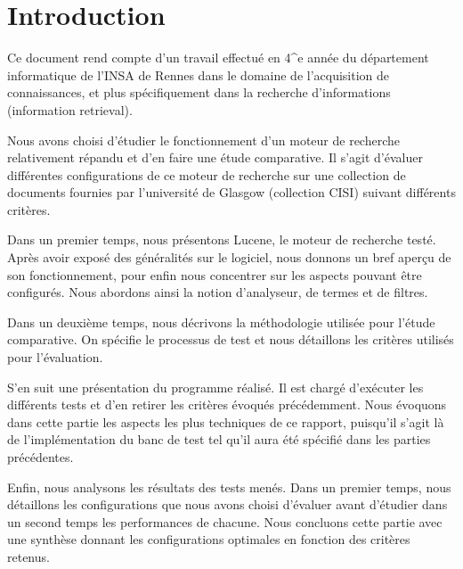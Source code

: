 \section{Introduction}

Ce document rend compte d’un travail effectué en 4^{e} année du département informatique de l’INSA de Rennes dans le domaine de l’acquisition de connaissances, et plus spécifiquement dans la recherche d’informations (information retrieval).

Nous avons choisi d’étudier le fonctionnement d’un moteur de recherche relativement répandu et d’en faire une étude comparative. Il s’agit d’évaluer différentes configurations de ce moteur de recherche sur une collection de documents fournies par l’université de Glasgow (collection CISI) suivant différents critères.

Dans un premier temps, nous présentons Lucene, le moteur de recherche testé. Après avoir exposé des généralités sur le logiciel, nous donnons un bref aperçu de son fonctionnement, pour enfin nous concentrer sur les aspects pouvant être configurés. Nous abordons ainsi la notion d’analyseur, de termes et de filtres.

Dans un deuxième temps, nous décrivons la méthodologie utilisée pour l’étude comparative. On spécifie le processus de test et nous détaillons les critères utilisés pour l’évaluation.

S’en suit une présentation du programme réalisé. Il est chargé d’exécuter les différents tests et d’en retirer les critères évoqués précédemment. Nous évoquons dans cette partie les aspects les plus techniques de ce rapport, puisqu’il s’agit là de l’implémentation du banc de test tel qu’il aura été spécifié dans les parties précédentes.

Enfin, nous analysons les résultats des tests menés. Dans un premier temps, nous détaillons les configurations que nous avons choisi d’évaluer avant d’étudier dans un second temps les performances de chacune. Nous concluons cette partie avec une synthèse donnant les configurations optimales en fonction des critères retenus.

























